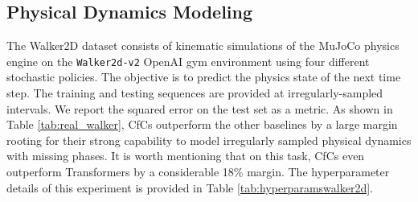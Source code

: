 \documentclass[12pt]{article}
\begin{document}
\subsection*{Physical Dynamics Modeling}
The Walker2D dataset consists of kinematic simulations of the MuJoCo physics engine \cite{todorov2012mujoco} on the \texttt{Walker2d-v2} OpenAI gym \cite{brockman2016openai} environment using four different stochastic policies.
The objective is to predict the physics state of the next time step. The training and testing sequences are provided at irregularly-sampled intervals. We report the squared error on the test set as a metric. As shown in Table \ref{tab:real_walker}, CfCs outperform the other baselines by a large margin rooting for their strong capability to model irregularly sampled physical dynamics with missing phases. It is worth mentioning that on this task, CfCs even outperform Transformers by a considerable 18\% margin. The hyperparameter details of this experiment is provided in Table \ref{tab:hyperparamswalker2d}. 
\end{document}
